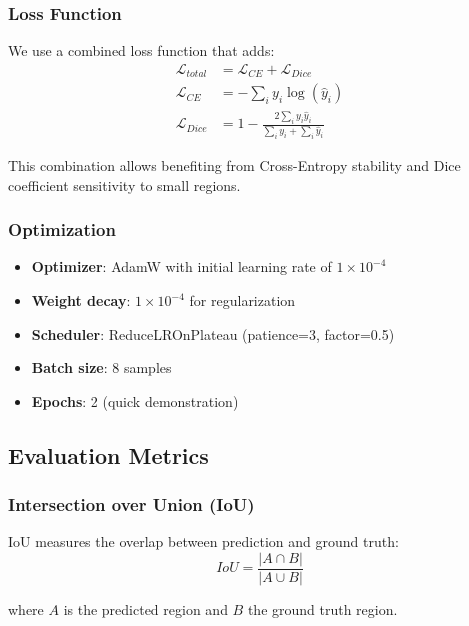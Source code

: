 \documentclass[12pt,a4paper]{article}
\begin{document}
\subsubsection{Loss Function}

We use a combined loss function that adds:
\begin{align}
\mathcal{L}_{total} &= \mathcal{L}_{CE} + \mathcal{L}_{Dice} \\
\mathcal{L}_{CE} &= -\sum_{i} y_i \log(\hat{y}_i) \\
\mathcal{L}_{Dice} &= 1 - \frac{2\sum_{i} y_i \hat{y}_i}{\sum_{i} y_i + \sum_{i} \hat{y}_i}
\end{align}

This combination allows benefiting from Cross-Entropy stability and Dice coefficient sensitivity to small regions.

\subsubsection{Optimization}

\begin{itemize}
    \item \textbf{Optimizer}: AdamW with initial learning rate of $1 \times 10^{-4}$
    \item \textbf{Weight decay}: $1 \times 10^{-4}$ for regularization
    \item \textbf{Scheduler}: ReduceLROnPlateau (patience=3, factor=0.5)
    \item \textbf{Batch size}: 8 samples
    \item \textbf{Epochs}: 2 (quick demonstration)
\end{itemize}

\subsection{Evaluation Metrics}

\subsubsection{Intersection over Union (IoU)}

IoU measures the overlap between prediction and ground truth:
\begin{equation}
IoU = \frac{|A \cap B|}{|A \cup B|}
\end{equation}

where $A$ is the predicted region and $B$ the ground truth region.
\end{document}
